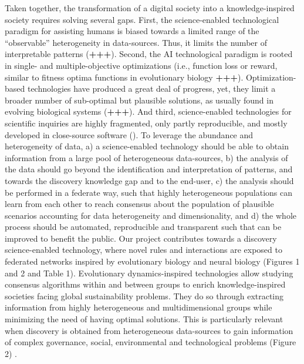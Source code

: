 \documentclass[11pt, a4paper]{article} %
\begin{document}
Taken together, the transformation of a digital society into a
knowledge-inspired society requires solving several gaps. First, the
science-enabled technological paradigm for assisting humans is biased
towards a limited range of the ``observable'' heterogeneity in
data-sources. Thus, it limits the number of interpretable patterns
({\bf +++}). Second, the AI technological paradigm is rooted in
single- and multiple-objective optimizations (i.e., function loss or
reward, similar to fitness optima functions in evolutionary biology
{\bf +++}). Optimization-based technologies have produced a great deal
of progress, yet, they limit a broader number of sub-optimal but
plausible solutions, as usually found in evolving biological systems
({\bf +++}). And third, science-enabled technologies for scientific
inquiries are highly fragmented, only partly reproducible, and mostly
developed in close-source software
(\citep{Inhaber1977,Ioannidis2005,Fang2011,Gunther2018,Hardwicke2018,Mehrabi2019,Real2020}). To
leverage the abundance and heterogeneity of data, a) a science-enabled
technology should be able to obtain information from a large pool of
heterogeneous data-sources, b) the analysis of the data should go
beyond the identification and interpretation of patterns, and towards
the discovery knowledge gap and to the end-user, c) the analysis
should be performed in a federate way, such that highly heterogeneous
populations can learn from each other to reach consensus about the
population of plausible scenarios accounting for data heterogeneity
and dimensionality, and d) the whole process should be automated,
reproducible and transparent such that can be improved to benefit the
public. Our project contributes towards a discovery science-enabled
technology, where novel rules and interactions are exposed to
federated networks inspired by evolutionary biology and neural biology
(Figures 1 and 2 and Table 1). Evolutionary dynamics-inspired
technologies allow studying consensus algorithms within and between
groups to enrich knowledge-inspired societies facing global
sustainability problems. They do so through extracting information
from highly heterogeneous and multidimensional groups while minimizing
the need of having optimal solutions. This is particularly relevant
when discovery is obtained from heterogeneous data-sources to gain
information of complex governance, social, environmental and
technological problems (Figure 2) \citep{Mastrangelo2019}.
\end{document}
